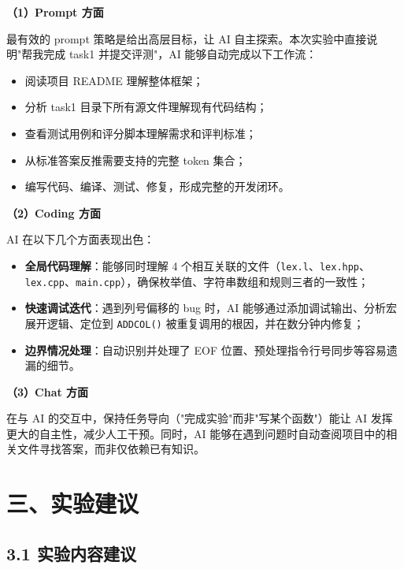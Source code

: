 \documentclass[12pt,a4paper]{article}
\begin{document}
\textbf{（1）Prompt 方面}

最有效的 prompt 策略是给出高层目标，让 AI 自主探索。本次实验中直接说明"帮我完成 task1 并提交评测"，AI 能够自动完成以下工作流：
\begin{itemize}[leftmargin=2em]
    \item 阅读项目 README 理解整体框架；
    \item 分析 task1 目录下所有源文件理解现有代码结构；
    \item 查看测试用例和评分脚本理解需求和评判标准；
    \item 从标准答案反推需要支持的完整 token 集合；
    \item 编写代码、编译、测试、修复，形成完整的开发闭环。
\end{itemize}

\textbf{（2）Coding 方面}

AI 在以下几个方面表现出色：
\begin{itemize}[leftmargin=2em]
    \item \textbf{全局代码理解}：能够同时理解 4 个相互关联的文件（\texttt{lex.l}、\texttt{lex.hpp}、\texttt{lex.cpp}、\texttt{main.cpp}），确保枚举值、字符串数组和规则三者的一致性；
    \item \textbf{快速调试迭代}：遇到列号偏移的 bug 时，AI 能够通过添加调试输出、分析宏展开逻辑、定位到 \texttt{ADDCOL()} 被重复调用的根因，并在数分钟内修复；
    \item \textbf{边界情况处理}：自动识别并处理了 EOF 位置、预处理指令行号同步等容易遗漏的细节。
\end{itemize}

\textbf{（3）Chat 方面}

在与 AI 的交互中，保持任务导向（"完成实验"而非"写某个函数"）能让 AI 发挥更大的自主性，减少人工干预。同时，AI 能够在遇到问题时自动查阅项目中的相关文件寻找答案，而非仅依赖已有知识。

\section{三、实验建议}

\subsection{3.1 实验内容建议}
\end{document}
